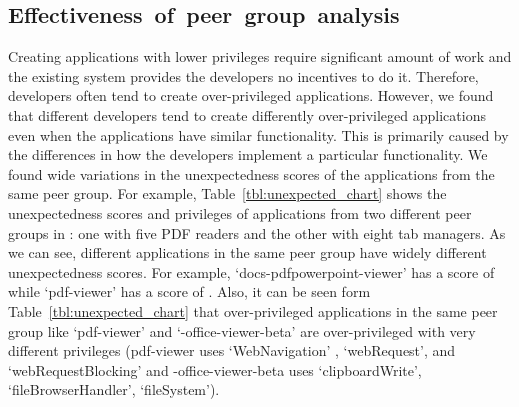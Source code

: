 \subsection{\mbox{Effectiveness of peer group analysis}}
\label{pga_effectiveness}
Creating applications with lower privileges require significant amount of work and the existing system 
provides the developers no incentives to do it. Therefore, developers often tend to create over-privileged 
applications. However, we found that different developers tend to create differently over-privileged 
applications even when the applications have similar functionality. This is primarily caused 
by the differences in how the developers implement a particular functionality. We found wide 
variations in the unexpectedness scores of the applications from the same peer group.   
For example, Table~\ref{tbl:unexpected_chart} shows the unexpectedness scores and privileges of 
applications from two different peer groups in \ChromeMarket{}: one with five PDF readers and the other 
with eight tab managers. As we can see, different applications in the same peer group have widely different unexpectedness 
scores. For example, `docs-pdfpowerpoint-viewer' has a score of  while  `pdf-viewer' has a score 
of . Also, it can be seen form Table~\ref{tbl:unexpected_chart} that over-privileged applications 
in the same peer group like `pdf-viewer' and `\Chrome{}-office-viewer-beta' are over-privileged with 
very different privileges (pdf-viewer uses `WebNavigation' , `webRequest', and `webRequestBlocking' and
\Chrome{}-office-viewer-beta uses `clipboardWrite', `fileBrowserHandler', `fileSystem').

